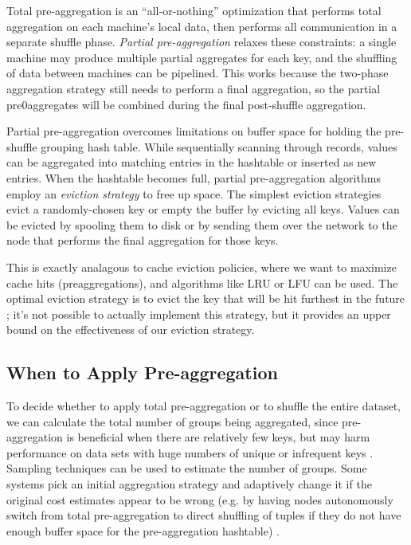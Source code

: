 \documentclass[12pt]{article}
\begin{document}
Total pre-aggregation is an ``all-or-nothing'' optimization that performs
total aggregation on each machine's local data, then performs all
communication in a separate shuffle phase.
\emph{Partial pre-aggregation} \cite{partial-preaggregation} relaxes these
constraints: a single machine may produce multiple partial aggregates for each
key, and the shuffling of data between machines can be pipelined.
This works because the two-phase aggregation strategy still needs to perform
a final aggregation, so the partial pre0aggregates will be combined during
the final post-shuffle aggregation.

Partial pre-aggregation overcomes limitations on buffer space for holding the pre-shuffle grouping hash table.
While sequentially scanning through records, values can be aggregated into matching entries in the hashtable or inserted as new entries.
When the hashtable becomes full, partial pre-aggregation algorithms employ an \emph{eviction strategy} to free up space.
The simplest eviction strategies evict a randomly-chosen key or empty the buffer by evicting all keys.
Values can be evicted by spooling them to disk or by sending them over the network to the node that performs the final aggregation for those keys.

This is exactly analagous to cache eviction policies, where we want to maximize cache hits (preaggregations), and algorithms like LRU or LFU can be used.
The optimal eviction strategy is to evict the key that will be hit furthest in
the future \cite{Belady1966}; it's not possible to actually implement this
strategy, but it provides an upper bound on the effectiveness of our eviction
strategy.

\subsection{When to Apply Pre-aggregation}

To decide whether to apply total pre-aggregation or to shuffle the entire
dataset, we can calculate the total number of groups being aggregated, since
pre-aggregation is beneficial when there are relatively few keys, but may harm
performance on data sets with huge numbers of unique or infrequent keys
\cite{adaptive-aggregation}.
Sampling techniques can be used to estimate the number of groups.
Some systems pick an initial aggregation strategy and adaptively change it if
the original cost estimates appear to be wrong (e.g. by having nodes
autonomously switch from total pre-aggregation to direct shuffling of tuples
if they do not have enough buffer space for the pre-aggregation hashtable)
\cite{adaptive-aggregation}.
\end{document}
